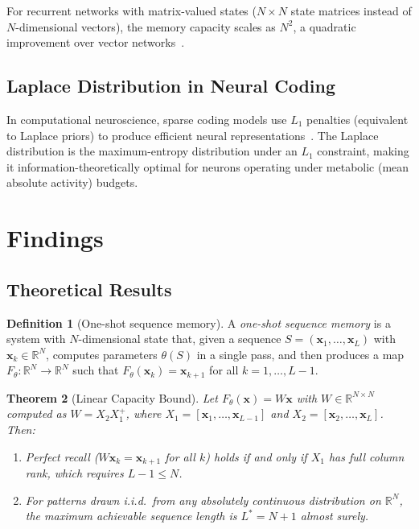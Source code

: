 \documentclass[11pt]{article}
\newtheorem{theorem}{Theorem}
\theoremstyle{definition}
\newtheorem{definition}[theorem]{Definition}
\theoremstyle{remark}
\begin{document}
For recurrent networks with matrix-valued states ($N \times N$ state matrices instead of $N$-dimensional vectors), the memory capacity scales as $N^2$, a quadratic improvement over vector networks~\cite{matrix_rnn2021}.

\subsection{Laplace Distribution in Neural Coding}

In computational neuroscience, sparse coding models use $L_1$ penalties (equivalent to Laplace priors) to produce efficient neural representations~\cite{sparse_coding}. The Laplace distribution is the maximum-entropy distribution under an $L_1$ constraint, making it information-theoretically optimal for neurons operating under metabolic (mean absolute activity) budgets.

\section{Findings}

\subsection{Theoretical Results}

\begin{definition}[One-shot sequence memory]
A \emph{one-shot sequence memory} is a system with $N$-dimensional state that, given a sequence $S = (\mathbf{x}_1, \ldots, \mathbf{x}_L)$ with $\mathbf{x}_k \in \mathbb{R}^N$, computes parameters $\theta(S)$ in a single pass, and then produces a map $F_\theta: \mathbb{R}^N \to \mathbb{R}^N$ such that $F_\theta(\mathbf{x}_k) = \mathbf{x}_{k+1}$ for all $k = 1, \ldots, L-1$.
\end{definition}

\begin{theorem}[Linear Capacity Bound]\label{thm:linear}
Let $F_\theta(\mathbf{x}) = W\mathbf{x}$ with $W \in \mathbb{R}^{N \times N}$ computed as $W = X_2 X_1^+$, where $X_1 = [\mathbf{x}_1, \ldots, \mathbf{x}_{L-1}]$ and $X_2 = [\mathbf{x}_2, \ldots, \mathbf{x}_L]$. Then:
\begin{enumerate}
    \item[(i)] Perfect recall ($W\mathbf{x}_k = \mathbf{x}_{k+1}$ for all $k$) holds if and only if $X_1$ has full column rank, which requires $L - 1 \leq N$.
    \item[(ii)] For patterns drawn i.i.d.\ from any absolutely continuous distribution on $\mathbb{R}^N$, the maximum achievable sequence length is $L^* = N + 1$ almost surely.
\end{enumerate}
\end{theorem}
\end{document}
